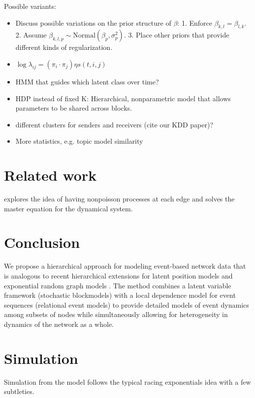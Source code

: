 \documentclass[11pt]{article}
\begin{document}
Possible variants:
\begin{itemize}
\item Discuss possible variations on the prior structure of $\beta$: 1. Enforce $\beta_{k,l} = \beta_{l,k}$. 2. Assume $\beta_{k,l,p} \sim \mbox{Normal}(\beta_p,\sigma_p^2)$. 3. Place other priors that provide different kinds of regularization. 
\item $\log \lambda_{ij} = (\pi_i \cdot \pi_j) \eta s(t,i,j)$
\item  HMM that guides which latent class over time?
\item  HDP instead of fixed K: Hierarchical, nonparametric model that allows parameters to be shared across blocks.
\item different clusters for senders and receivers (cite our KDD paper)?
\item More statistics, e.g. topic model similarity
\end{itemize}

\section{Related work}
\cite{Tillman2011} explores the idea of having nonpoisson processes at each edge and solves the master equation for the dynamical system.

\section{Conclusion}
 We propose a hierarchical approach for modeling event-based network data that is analogous to recent hierarchical extensions for latent position models \cite{Handcock2007} and exponential random graph models \cite{Schweinberger2011}.  The method combines a latent variable framework (stochastic blockmodels) with a local dependence model for event sequences (relational event models) to provide detailed models of event dynamics among subsets of nodes while simultaneously allowing for heterogeneity in dynamics of the network as a whole.


\appendix
\section{Simulation}

Simulation from the model follows the typical racing exponentials idea with a few subtleties.
\end{document}
